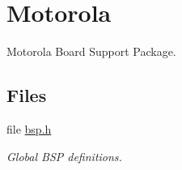 \hypertarget{group__RTEMSBSPsPowerPCMotorola}{}\section{Motorola}
\label{group__RTEMSBSPsPowerPCMotorola}


Motorola Board Support Package.  


\subsection*{Files}
\begin{DoxyCompactItemize}
\item 
file \mbox{\hyperlink{bsps_2powerpc_2motorola__powerpc_2include_2bsp_8h}{bsp.\+h}}
\begin{DoxyCompactList}\small\item\em Global B\+SP definitions. \end{DoxyCompactList}\end{DoxyCompactItemize}
